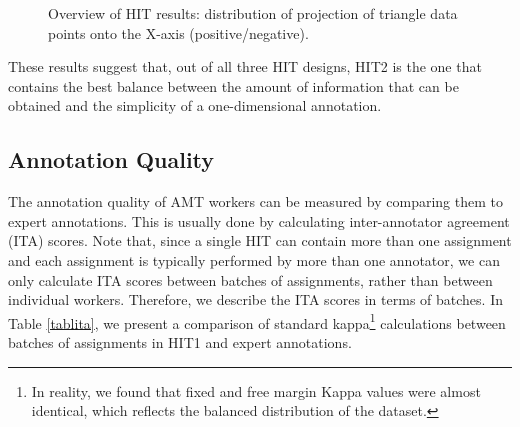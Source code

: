 \documentclass[11pt, a4paper,onecolumn]{article}
\begin{document}
\begin{figure}
  \begin{center}
	\caption{Overview of HIT results: distribution of projection of triangle data points onto the X-axis (positive/negative).}
	\label{distr3b}
  \end{center}
\end{figure}




These results suggest that, out of all three HIT designs, HIT2 is the one that contains the best balance between the amount of information that can be obtained and the simplicity of a one-dimensional annotation. 



\subsection{Annotation Quality}
\label{sect:quality}

The annotation quality of AMT workers can be measured by comparing them to expert annotations. This is usually done by calculating inter-annotator agreement (ITA) scores. Note that, since a single HIT can contain more than one assignment and each assignment is typically performed by more than one annotator, we can only calculate ITA scores between batches of assignments, rather than between individual workers. Therefore, we describe the ITA scores in terms of batches. In Table \ref{tablita}, we present a comparison of standard kappa\footnote{In reality, we found that fixed and free margin Kappa values were almost identical, which reflects the balanced distribution of the dataset.} calculations \cite{eugenio_kappa_2004} between batches of assignments in HIT1 and expert annotations.
\end{document}
